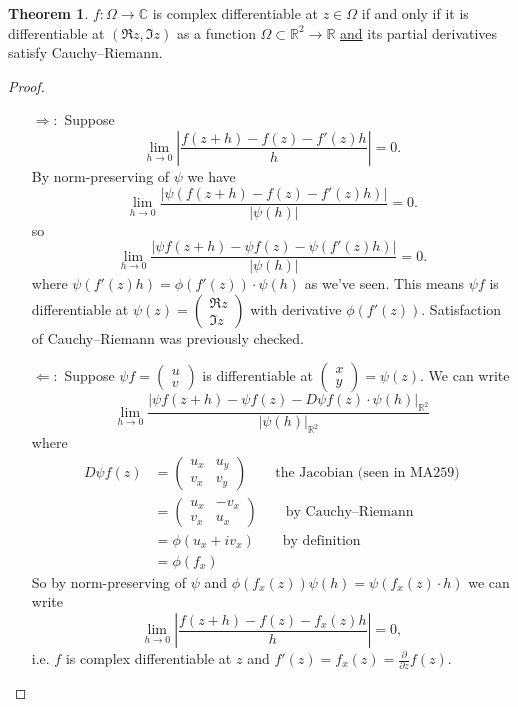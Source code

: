 \documentclass[a4paper]{article}
\theoremstyle{definition}
\newtheorem{thm}[defn]{Theorem}
\begin{document}
\begin{thm}
$f:\Omega \rightarrow \mathbb C$ is complex differentiable at $z\in \Omega$ if and only if it is differentiable at $\left(\Re z, \Im z\right)$ as a function $\Omega \subset \mathbb R^2 \rightarrow \mathbb R$ \underline{and} its partial derivatives satisfy Cauchy–Riemann.
\end{thm}
\begin{proof}
\begin{itemize}
    \item[$\Rightarrow:$] Suppose
\[
\lim_{h\rightarrow 0} \left| \frac{f(z+h)-f(z)-f'(z)h}{h} \right| =0.
\]
By norm-preserving of $\psi$ we have
\[
\lim_{h\rightarrow 0}\frac{|\psi \left( f(z+h)-f(z)-f'(z)h \right)|}{|\psi (h)|}=0.
\]
so
\[
\lim_{h\rightarrow 0}  \frac{\left|\psi  f(z+h)-\psi  f(z)-\psi (f'(z)h)\right|}{|\psi (h)|}  =0.
\]
where $\psi (f'(z)h) = \phi (f'(z)) \cdot \psi(h)$ as we've seen. This means $\psi f$ is differentiable at $\psi (z) = \begin{pmatrix} \Re z \\ \Im z \end{pmatrix}$ with derivative $\phi (f'(z)).$ Satisfaction of Cauchy–Riemann was previously checked.
\item[$\Leftarrow:$] Suppose $\psi f = \begin{pmatrix}u\\v\end{pmatrix}$ is differentiable at $\begin{pmatrix}x\\y\end{pmatrix}=\psi (z)$. We can write
\[
\lim_{h\rightarrow 0} \frac{|\psi f (z+h) - \psi f(z) - D\psi f (z) \cdot \psi (h)|_{\mathbb R^2}}{|\psi(h)|_{\mathbb R^2}}
\]
where
\[
\begin{aligned}
D\psi f (z) &= \begin{pmatrix} u_x & u_y \\ v_x & v_y \end{pmatrix} \qquad \text{the Jacobian (seen in MA259)} \\
&= \begin{pmatrix} u_x & -v_x \\ v_x & u_x \end{pmatrix} \qquad \text{by Cauchy–Riemann} \\
&= \phi (u_x +i v_x) \qquad \text{by definition} \\
&= \phi (f_x)
\end{aligned}
\]
So by norm-preserving of $\psi$ and $\phi (f_x(z)) \psi (h) = \psi (f_x(z)\cdot h)$ we can write
\[
\lim_{h\rightarrow 0} \left|\frac{f(z+h)-f(z)-f_x(z)h}{h} \right|=0,
\]
i.e. $f$ is complex differentiable at $z$ and $f'(z) = f_x(z) = \frac{\partial}{\partial z} f(z)$.
\end{itemize}
\end{proof}
\end{document}
